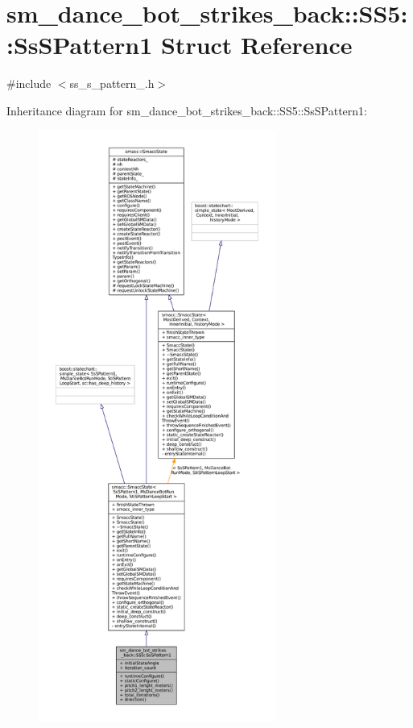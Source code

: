 \hypertarget{structsm__dance__bot__strikes__back_1_1SS5_1_1SsSPattern1}{}\section{sm\+\_\+dance\+\_\+bot\+\_\+strikes\+\_\+back\+:\+:S\+S5\+:\+:Ss\+S\+Pattern1 Struct Reference}
\label{structsm__dance__bot__strikes__back_1_1SS5_1_1SsSPattern1}


{\ttfamily \#include $<$ss\+\_\+s\+\_\+pattern\+\_.\+h$>$}



Inheritance diagram for sm\+\_\+dance\+\_\+bot\+\_\+strikes\+\_\+back\+:\+:S\+S5\+:\+:Ss\+S\+Pattern1\+:
\nopagebreak
\begin{figure}[H]
\begin{center}
\leavevmode
\includegraphics[height=550pt]{structsm__dance__bot__strikes__back_1_1SS5_1_1SsSPattern1__inherit__graph}
\end{center}
\end{figure}


